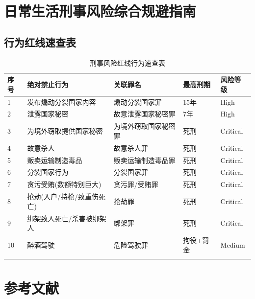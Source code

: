 \documentclass[12pt,a4paper]{article}
\begin{document}
\clearpage

\section{日常生活刑事风险综合规避指南}

\subsection{行为红线速查表}

\begin{longtable}{p{1cm}p{4cm}p{3cm}p{3cm}p{2cm}}
  \toprule
  \textbf{序号} & \textbf{绝对禁止行为} & \textbf{关联罪名} & \textbf{最高刑期} & \textbf{风险等级} \\
  \midrule
  1 & 发布煽动分裂国家内容 & 煽动分裂国家罪 & 15年 & High \\
  2 & 泄露国家秘密 & 故意泄露国家秘密罪 & 7年 & High \\
  3 & 为境外窃取提供国家秘密 & 为境外窃取国家秘密罪 & 死刑 & Critical \\
  4 & 故意杀人 & 故意杀人罪 & 死刑 & Critical \\
  5 & 贩卖运输制造毒品 & 贩卖运输制造毒品罪 & 死刑 & Critical \\
  6 & 分裂国家行为 & 分裂国家罪 & 死刑 & Critical \\
  7 & 贪污受贿(数额特别巨大) & 贪污罪/受贿罪 & 死刑 & Critical \\
  8 & 抢劫(入户/持枪/致重伤死亡) & 抢劫罪 & 死刑 & Critical \\
  9 & 绑架致人死亡/杀害被绑架人 & 绑架罪 & 死刑 & Critical \\
  10 & 醉酒驾驶 & 危险驾驶罪 & 拘役+罚金 & Medium \\
  \bottomrule
  \caption{刑事风险红线行为速查表}
\end{longtable}

\clearpage

\section{参考文献}
\end{document}
